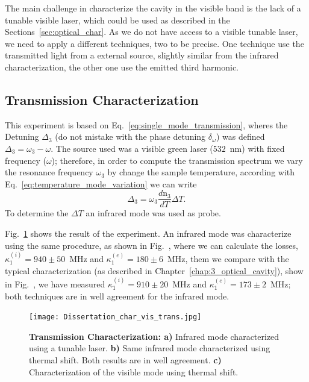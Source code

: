 The main challenge in characterize the cavity in the visible band is the lack of a tunable visible laser, which could be used as described in the Sections~\ref{sec:optical_char}. As we do not have access to a visible tunable laser, we need to apply a different techniques, two to be precise. One technique use the transmitted light from a external source, slightly similar from the infrared characterization, the other one use the emitted third harmonic. 

\subsection{Transmission Characterization}

This experiment is based on Eq.~\ref{eq:single_mode_transmission}, wheres the Detuning $\Delta_3$ (do not mistake with the phase detuning $\delta_\omega$) was defined $\Delta_3 = \omega_3 - \omega$. The source used was a visible green laser ($532$~nm) with fixed frequency ($\omega$); therefore, in order to compute the transmission spectrum we vary the resonance frequency $\omega_3$ by change the sample temperature, according with Eq.~\ref{eq:temperature_mode_variation} we can write 
\begin{equation}
    \Delta_3 = \omega_3\frac{d\text{n}_3}{dT}\Delta T.
\end{equation}
To determine the $\Delta T$ an infrared mode was used as probe.

Fig.~\ref{fig:mode_char_trans} shows the result of the experiment. An infrared mode was characterize using the same procedure, as shown in Fig.~, where we can calculate the losses, $\kappa_1^{(i)} = 940\pm 50$~MHz and $\kappa_1^{(e)} = 180 \pm 6$~MHz, them we compare with the typical characterization (as described in Chapter~\ref{chap:3_optical_cavity}), show in Fig.~, we have measured $\kappa_1^{(i)} = 910\pm 20$~MHz and $\kappa_1^{(e)} = 173 \pm 2$~MHz; both techniques are in well agreement for the infrared mode.
\begin{figure}[!h]
    \centering
    \texttt{[image: Dissertation\_char\_vis\_trans.jpg]}
    \caption{\textbf{Transmission Characterization: a)} Infrared mode characterized using a tunable laser. \textbf{b)} Same infrared mode characterized using thermal shift. Both results are in well agreement. \textbf{c)} Characterization of the visible mode using thermal shift. }
    \label{fig:mode_char_trans}
\end{figure}

